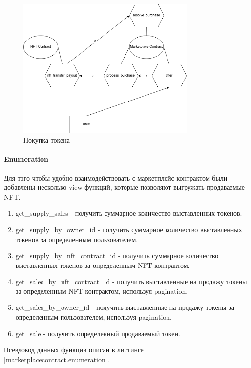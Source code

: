 \begin{figure}[h]
	\centering
	\includegraphics[height=70mm]{fig/buy.png}
	\caption{Покупка токена}
    \label{marketplacecontract.buypng}
\end{figure}

\paragraph{Enumeration}

Для того чтобы удобно взаимодействовать с маркетплейс контрактом были добавлены несколько view функций, которые позволяют выгружать продаваемые NFT.
\begin{enumerate}
\item get\_supply\_sales - получить суммарное количество выставленных токенов.
\item get\_supply\_by\_owner\_id - получить суммарное количество выставленных токенов за определенным пользователем.
\item get\_supply\_by\_nft\_contract\_id - получить суммарное количество выставленных токенов за определенным NFT контрактом.
\item get\_sales\_by\_nft\_contract\_id - получить выставленные на продажу токены за определенным NFT контрактом, используя pagination.
\item get\_sales\_by\_owner\_id - получить выставленные на продажу токены за определенным пользователем, используя pagination.
\item get\_sale - получить определенный продаваемый токен.
\end{enumerate}

Псевдокод данных функций описан в листинге {\color{blue}\ref{marketplacecontract.enumeration}}.

